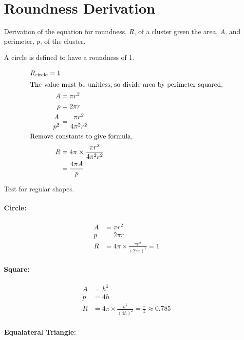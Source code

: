 
\section{Roundness Derivation}
\label{app:roundness_derivation}

Derivation of the equation for roundness, $R$, of a cluster given the area,
$A$, and perimeter, $p$, of the cluster.

A circle is defined to have a roundness of 1.

\begin{align}
	R_\textrm{circle} = 1 \\
\intertext{The value must be unitless, so divide area by perimeter squared,}
	A &= \pi r^2 \\
	p &= 2\pi r \\
	\frac{A}{p^2} &= \frac{\pi r^2}{4\pi^2 r^2} \\
\intertext{Remove constants to give formula,}
	R &= 4\pi \times \frac{\pi r^2}{4\pi^2 r^2} \\
		&= \frac{4\pi A}{p}
\end{align}

Test for regular shapes.

\paragraph{Circle:}
\label{par:circle}

\begin{align}
	A &= \pi r^2 \\
	p &= 2\pi r \\
	R &= 4\pi \times \frac{\pi r^2}{(2\pi r)^2} = 1
\end{align}

\paragraph{Square:}
\label{par:square}

\begin{align}
	A &= h^2 \\
	p &= 4h \\
	R &= 4\pi \times \frac{h^2}{(4h)^2} = \frac{\pi}{4} \approx 0.785
\end{align}

\paragraph{Equalateral Triangle:}
\label{par:equalateral_triangle}

